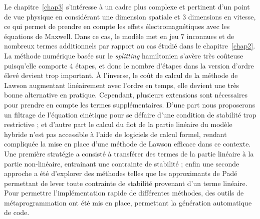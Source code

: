 Le chapitre~\ref{chap3} s'intéresse à un cadre plus complexe et pertinent d'un point de vue physique en considérant une dimension spatiale et 3 dimensions en vitesse, ce qui permet de prendre en compte les effets électromagnétiques avec les équations de Maxwell. Dans ce cas, le modèle met en jeu 7 inconnues et de nombreux termes additionnels par rapport au cas étudié dans le chapitre~\ref{chap2}. La méthode numérique basée sur le \emph{splitting} hamiltonien s'avère très coûteuse puisqu'elle comporte 4 étapes, et donc le nombre d'étapes dans la version d'ordre élevé devient trop important. À l'inverse, le coût de calcul de la méthode de Lawson augmentant linéairement avec l'ordre en temps, elle devient une très bonne alternative en pratique. Cependant, plusieurs extensions sont nécessaires pour prendre en compte les termes supplémentaires. D'une part nous proposerons un filtrage de l'équation cinétique pour se défaire d'une condition de stabilité trop restrictive ; et d'autre part le calcul du flot de la partie linéaire du modèle hybride n'est pas accessible à l'aide de logiciels de calcul formel, rendant compliquée la mise en place d'une méthode de Lawson efficace dans ce contexte. Une première stratégie a consisté à transférer des termes de la partie linéaire à la partie non-linéaire, entrainant une contrainte de stabilité ; enfin une seconde approche a été d'explorer des méthodes telles que les approximants de Padé permettant de lever toute contrainte de stabilité provenant d'un terme linéaire. Pour permettre l'implémentation rapide de différentes méthodes, des outils de métaprogrammation ont été mis en place, permettant la génération automatique de code.
